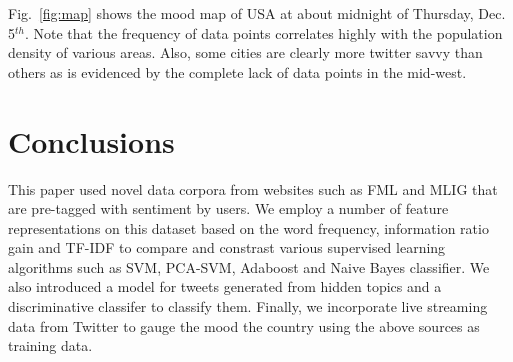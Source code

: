 \documentclass[11pt, letterpaper, conference, final, twocolumn]{ieeeconf}
\begin{document}
Fig.~\ref{fig:map} shows the mood map of USA at about midnight of Thursday, Dec. 5$^{th}$. Note that the frequency of data points correlates highly with the population density of various areas. Also, some cities are clearly more twitter savvy than others as is evidenced by the complete lack of data points in the mid-west. 
\section{Conclusions}
This paper used novel data corpora from websites such as FML and MLIG that are pre-tagged with sentiment by users. We employ a number of feature representations on this dataset based on the word frequency, information ratio gain and TF-IDF to compare and constrast various supervised learning algorithms such as SVM, PCA-SVM, Adaboost and Naive Bayes classifier. We also introduced a model for tweets generated from hidden topics and a discriminative classifer to classify them. Finally, we incorporate live streaming data from Twitter to gauge the mood the country using the above sources as training data.


\end{document}
